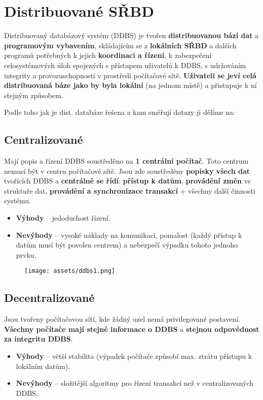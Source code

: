 \section{Distribuované SŘBD}
Distribuovaný databázový systém (DDBS) je tvořen \textbf{distribuovanou bází dat} a \textbf{programovým vybavením}, skládajícím se z \textbf{lokálních SŘBD} a dalších programů potřebných k jejich \textbf{koordinaci a řízení}, k zabezpečení celosystémových úloh spojených s přístupem uživatelů k DDBS, s udržováním integrity a provozuschopnosti v prostředí počítačové sítě. \textbf{Uživateli se jeví celá distribuovaná báze jako by byla lokální} (na jednom místě) a přistupuje k ní stejným způsobem.

Podle toho jak je dist. databáze řešena a kam směřují dotazy ji dělíme na:

\subsection{Centralizované}
Mají popis a řízení DDBS soustředěno na \textbf{1 centrální počítač}. Toto centrum nemusí být v centru počítačové sítě. Jsou zde soustředěny \textbf{popisky všech dat} tvořících DDBS a \textbf{centrálně se řídí}: \textbf{přístup k datům}, \textbf{provádění změn} ve struktuře dat, \textbf{provádění a synchronizace transakcí} + všechny další činnosti systému.
\begin{itemize}
  \item \textbf{Výhody} -- jedoduchost řízení.
  \item \textbf{Nevýhody} -- vysoké náklady na komunikaci, pomalost (každý přístup k datům musí být povolen centrem) a nebezpečí výpadku tohoto jednoho prvku.
\end{itemize}

\begin{figure}[H]
  \centering
  \texttt{[image: assets/ddbs1.png]}
\end{figure}

\subsection{Decentralizované}
Jsou tvořeny počítačovou sítí, kde žádný uzel nemá privilegované postavení. \textbf{Všechny počítače mají stejné informace o DDBS} a \textbf{stejnou odpovědnost za integritu DDBS}.
\begin{itemize}
  \item \textbf{Výhody} -- větší stabilita (výpadek počítače způsobí max. ztrátu přístupu k lokálním datům).
  \item \textbf{Nevýhody} -- složitější algoritmy pro řízení transakcí než v centralizovaných DDBS.
\end{itemize}

